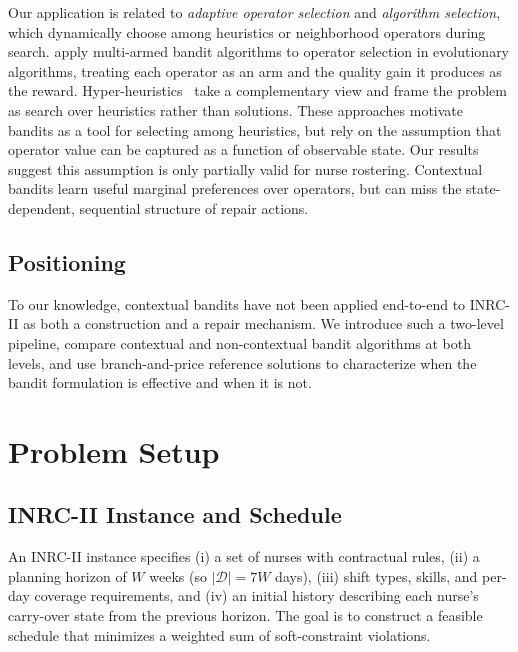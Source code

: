 \documentclass{article}
\begin{document}
Our application is related to \emph{adaptive operator selection} and
\emph{algorithm selection}, which dynamically choose among heuristics or
neighborhood operators during search. \citet{fialho2010analysis} apply
multi-armed bandit algorithms to operator selection in evolutionary
algorithms, treating each operator as an arm and the quality gain it
produces as the reward. Hyper-heuristics~\citep{burke2013hyper} take a
complementary view and frame the problem as search over heuristics rather
than solutions. These approaches motivate bandits as a tool for selecting
among heuristics, but rely on the assumption that operator value can be
captured as a function of observable state. Our results suggest this
assumption is only partially valid for nurse rostering. Contextual bandits
learn useful marginal preferences over operators, but can miss the
state-dependent, sequential structure of repair actions.

\subsection{Positioning}

To our knowledge, contextual bandits have not been applied end-to-end to
INRC-II as both a construction and a repair mechanism. We introduce such a
two-level pipeline, compare contextual and non-contextual bandit
algorithms at both levels, and use branch-and-price reference solutions
\citep{legrain2020rotation} to characterize when the bandit formulation is
effective and when it is not.

\section{Problem Setup}

\subsection{INRC-II Instance and Schedule}

An INRC-II instance specifies (i) a set of nurses with contractual rules,
(ii) a planning horizon of $W$ weeks (so $|\mathcal{D}| = 7W$ days),
(iii) shift types, skills, and per-day coverage requirements, and
(iv) an initial history describing each nurse's carry-over state from the
previous horizon. The goal is to construct a feasible schedule that
minimizes a weighted sum of soft-constraint violations.
\end{document}
